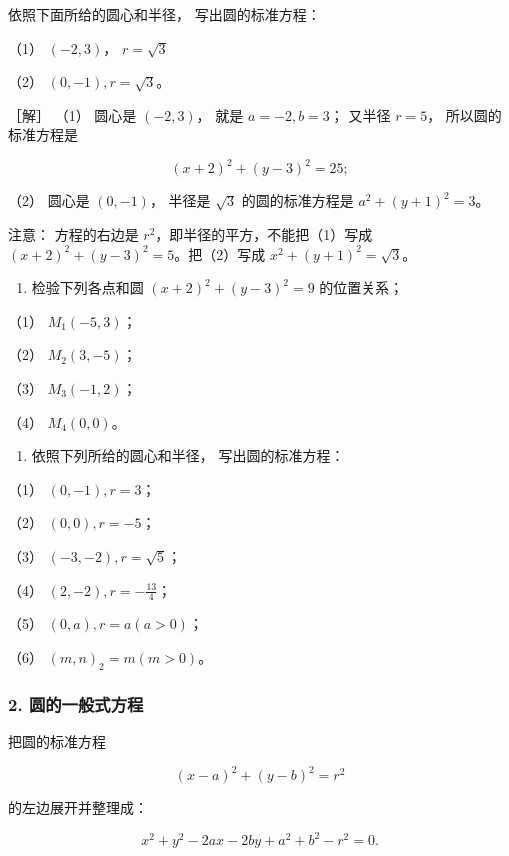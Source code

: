 依照下面所给的圆心和半径， 写出圆的标准方程：

（1） \((-2,3)\)， \(r=\sqrt{3}\)

（2） \((0, -1), r = \sqrt{3}\)。

［解］ （1） 圆心是 \((-2, 3)\)， 就是 \(a = -2, b = 3\)； 又半径
\(r = 5\)， 所以圆的标准方程是

\[
(x + 2) ^ {2} + (y - 3) ^ {2} = 25;
\]

（2） 圆心是 \((0, -1)\)， 半径是 \(\sqrt{3}\) 的圆的标准方程是
\(a^2 + (y + 1)^2 = 3\)。

注意： 方程的右边是 \(r^{2}\)，即半径的平方，不能把（1）写成
\((x+2)^{2}+(y-3)^{2}=5\)。把（2）写成 \(x^{2}+(y+1)^{2}=\sqrt{3}\)。

\begin{enumerate}
\def\labelenumi{\arabic{enumi}.}
\tightlist
\item
  检验下列各点和圆 \((x + 2)^2 + (y - 3)^2 = 9\) 的位置关系；
\end{enumerate}

（1） \(M_{1}(-5,3)\)；

（2） \(M_{2}(3, -5)\)；

（3） \(M_{3}(-1,2)\)；

（4） \(M_{4}(0,0)\)。

\begin{enumerate}
\def\labelenumi{\arabic{enumi}.}
\setcounter{enumi}{1}
\tightlist
\item
  依照下列所给的圆心和半径， 写出圆的标准方程：
\end{enumerate}

（1） \((0, -1), r = 3\)；

（2） \((0,0), r = -5\)；

（3） \((-3, -2), r = \sqrt{5}\)；

（4） \((2, -2), r = -\frac{13}{4}\)；

（5） \((0, a), r = a (a > 0)\)；

（6） \((m, n)_2 = m (m > 0)\)。

\subsubsection{2.
圆的一般式方程}\label{ux5706ux7684ux4e00ux822cux5f0fux65b9ux7a0b}

把圆的标准方程

\[
(x - a) ^ {2} + (y - b) ^ {2} = r^{2} \tag {1}
\]

的左边展开并整理成：

\[
x^{2} + y^{2} - 2 a x - 2 b y + a^{2} + b^{2} - r^{2} = 0.
\]

